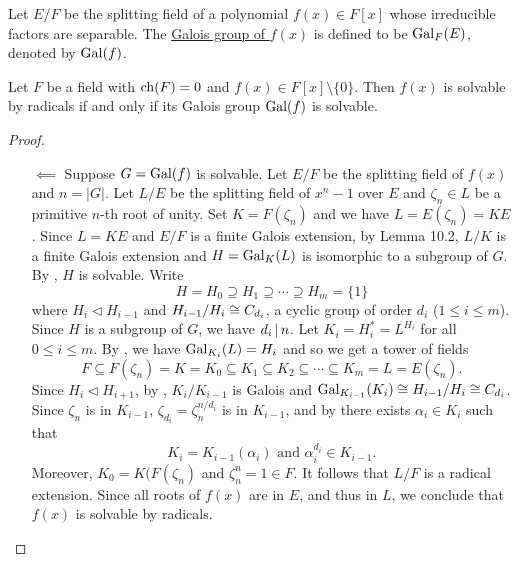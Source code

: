 \documentclass[11pt]{article}
\begin{document}
\begin{definition}
    Let $E/F$ be the splitting field of a polynomial $f(x)\in F[x]$ whose irreducible factors are separable. The \ul{Galois group of $f(x)$} is defined to be $\operatorname{Gal}_F(E)$, denoted by $\operatorname{Gal}(f)$.
\end{definition}

\begin{theorem}
    Let $F$ be a field with $\operatorname{ch}(F)=0$ and $f(x)\in F[x]\setminus\{0\}$. Then $f(x)$ is solvable by radicals if and only if its Galois group $\operatorname{Gal}(f)$ is solvable.
\end{theorem}

\begin{proof}\,
    \begin{itemize}
        \item[$\impliedby$] Suppose $G=\operatorname{Gal}(f)$ is solvable. Let $E/F$ be the splitting field of $f(x)$ and $n=|G|$. Let $L/E$ be the splitting field of $x^n-1$ over $E$ and $\zeta_n\in L$ be a primitive $n$-th root of unity. Set $K=F(\zeta_n)$ and we have $L=E(\zeta_n)=KE$. Since $L=KE$ and $E/F$ is a finite Galois extension, by Lemma 10.2, $L/K$ is a finite Galois extension and $H=\operatorname{Gal}_K(L)$ is isomorphic to a subgroup of $G$. By , $H$ is solvable. Write
        \[H=H_0\supseteq H_1\supseteq\cdots\supseteq H_m=\{1\}\]
        where $H_i\lhd H_{i-1}$ and $H_{i-1}/H_i\cong C_{d_i}$, a cyclic group of order $d_i$ ($1\leq i\leq m$). Since $H$ is a subgroup of $G$, we have $d_i\,|\, n$. Let $K_i=H_i^*=L^{H_i}$ for all $0\leq i\leq m$. By , we have $\operatorname{Gal}_{K_i}(L)=H_i$ and so we get a tower of fields
        \[F\subseteq F(\zeta_n)=K=K_0\subseteq K_1\subseteq K_2\subseteq\cdots\subseteq K_m=L=E(\zeta_n).\]
        Since $H_i\lhd H_{i+1}$, by , $K_i/K_{i-1}$ is Galois and $\operatorname{Gal}_{K_{i-1}}(K_i)\cong H_{i-1}/H_i\cong C_{d_i}$. Since $\zeta_n$ is in $K_{i-1}$, $\zeta_{d_i}=\zeta_n^{n/d_i}$ is in $K_{i-1}$, and by  there exists $\alpha_i\in K_i$ such that
        \[K_i=K_{i-1}(\alpha_i)\text{ and }\alpha_i^{d_i}\in K_{i-1}.\]
        Moreover, $K_0=K(F(\zeta_n)$ and $\zeta_n^n=1\in F$. It follows that $L/F$ is a radical extension. Since all roots of $f(x)$ are in $E$, and thus in $L$, we conclude that $f(x)$ is solvable by radicals.


\end{itemize}
\end{proof}
\end{document}
